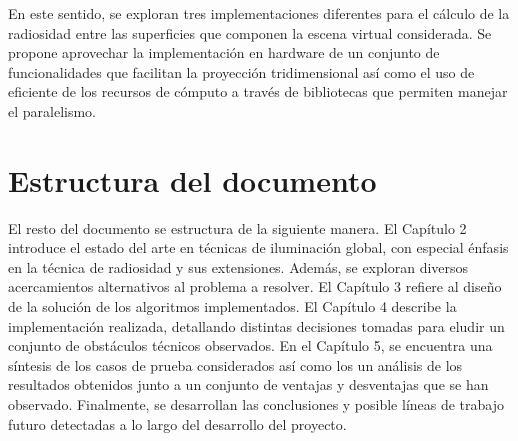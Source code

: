 En este sentido, se exploran tres implementaciones diferentes para el cálculo de la radiosidad entre las superficies que componen la escena virtual considerada. Se propone aprovechar la implementación en hardware de un conjunto de funcionalidades que facilitan la proyección tridimensional así como el uso de eficiente de los recursos de cómputo a través de bibliotecas que permiten manejar el paralelismo.  


\section{Estructura del documento}
\label{sec:estructuraDelDocumento}

El resto del documento se estructura de la siguiente manera. El Capítulo 2 introduce el estado del arte en técnicas de iluminación global, con especial énfasis en la técnica de radiosidad y sus extensiones. Además, se exploran diversos acercamientos alternativos al problema a resolver. El Capítulo 3 refiere al diseño de la solución de los algoritmos implementados. El Capítulo 4 describe la implementación realizada, detallando distintas decisiones tomadas para eludir un conjunto de obstáculos técnicos observados. En el Capítulo 5, se encuentra una síntesis de los casos de prueba considerados así como los un análisis de los resultados obtenidos junto a un conjunto de ventajas y desventajas que se han observado. Finalmente, se desarrollan las conclusiones y posible líneas de trabajo futuro detectadas a lo largo del desarrollo del proyecto.